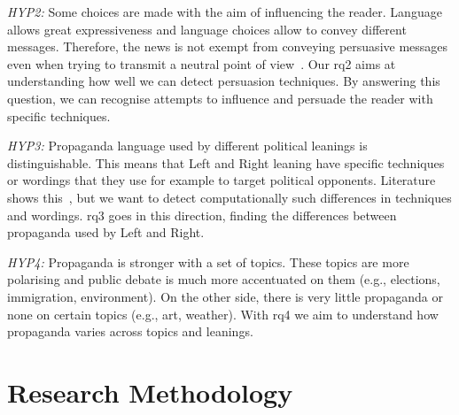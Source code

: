 \emph{HYP2:} Some choices are made with the aim of influencing the reader. Language allows great expressiveness and language choices allow to convey different messages. Therefore, the news is not exempt from conveying persuasive messages even when trying to transmit a neutral point of view~\citep{gass2018persuasion}.
Our \acrshort{rq}2 aims at understanding how well we can detect persuasion techniques. By answering this question, we can recognise attempts to influence and persuade the reader with specific techniques.

\emph{HYP3:} Propaganda language used by different political leanings is distinguishable. This means that Left and Right leaning have specific techniques or wordings that they use for example to target political opponents. Literature shows this~\citep{blumberg1986comparative}, but we want to detect computationally such differences in techniques and wordings.
\acrshort{rq}3 goes in this direction, finding the differences between propaganda used by Left and Right.

\emph{HYP4:} Propaganda is stronger with a set of topics. These topics are more polarising and public debate is much more accentuated on them (e.g., elections, immigration, environment). On the other side, there is very little propaganda or none on certain topics (e.g., art, weather).
With \acrshort{rq}4 we aim to understand how propaganda varies across topics and leanings.




\section{\statusgreen Research Methodology}
\label{sec:intro_method}

